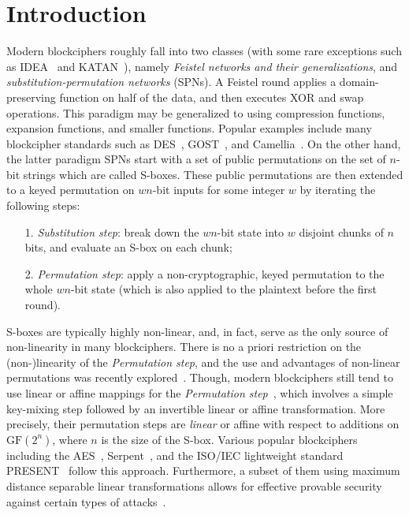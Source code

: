 
\section{Introduction}
\label{section:Introduction}

Modern blockciphers roughly fall into two classes (with some rare exceptions such as IDEA~\cite{EC:LaiMas90} and KATAN~\cite{CHES:DeCDunKne09}), namely {\it Feistel networks and their generalizations}, and {\it substitution-permutation networks} (SPNs). A Feistel round applies a domain-preserving function on half of the data, and then executes XOR and swap operations. This paradigm may be generalized to using compression functions, expansion functions, and smaller functions. Popular examples include many blockcipher standards such as DES~\cite{DESDesign}, GOST~\cite{GOSTDesign}, and Camellia~\cite{ISOIEC-18033-3:2010}. On the other hand, the latter paradigm SPNs start with a set of public permutations on the set of $n$-bit strings which are called S-boxes. These public permutations are then extended to a keyed permutation on $wn$-bit inputs for some integer $w$ by iterating the following steps:
\begin{enumerate}
	\item[1.] {\it Substitution step}: break down the $wn$-bit state into $w$ disjoint chunks of $n$ bits, and evaluate an S-box on each chunk;
	\item[2.] {\it Permutation step}: apply a non-cryptographic, keyed permutation to the whole $wn$-bit state (which is also applied to the plaintext before the first round).
\end{enumerate}
%
S-boxes are typically highly non-linear, and, in fact, serve as the only source of non-linearity in many blockciphers. There is no a priori restriction on the (non-)linearity of the {\it Permutation step}, and the use and advantages of non-linear permutations was recently explored~\cite{DBLP:journals/dcc/LiuRL18}. Though, modern blockciphers still tend to use linear or affine mappings for the {\it Permutation step}~\cite{DBLP:reference/crypt/Biryukov11aa}, which involves a simple key-mixing step followed
by an invertible linear or affine transformation. More precisely, their permutation steps are {\it linear} or affine with respect to additions on $\text{GF}(2^n)$, where $n$ is the size of the S-box. Various popular blockciphers including the AES~\cite{AESDesign}, Serpent~\cite{serpentProposal}, and the ISO/IEC lightweight standard PRESENT~\cite{CHES:BKLPPR07} follow this approach. Furthermore, a subset of them using maximum distance separable linear transformations allows for effective provable security against certain types of attacks~\cite{IMA:DaeRij01,AC:PSCYL02,FSE:PSLL03,miles2015substitution,EC:SLGRL16}.


